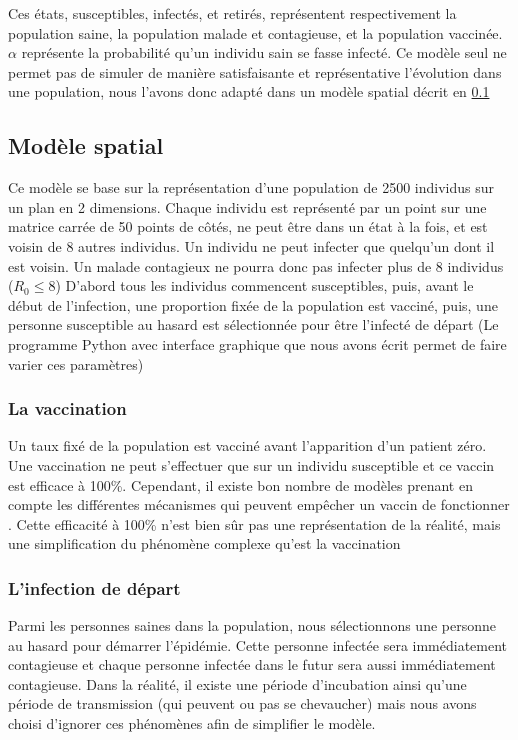\documentclass[journal, a4paper]{IEEEtran}
\begin{document}
	Ces états, susceptibles, infectés, et retirés, représentent respectivement la population saine, la population malade et contagieuse, et la population vaccinée. $\alpha$ représente la probabilité qu'un individu sain se fasse infecté.
	Ce modèle seul ne permet pas de simuler de manière satisfaisante et représentative l'évolution dans une population, nous l'avons donc adapté dans un modèle spatial décrit en \ref{sec:modele_spatial}


	\subsection{Modèle spatial}
	\label{sec:modele_spatial}
	Ce modèle se base sur la représentation d'une population de 2500 individus sur un plan en 2 dimensions. Chaque individu est représenté par un point sur une matrice carrée de 50 points de côtés, ne peut être dans un état à la fois, et est voisin de 8 autres individus. Un individu ne peut infecter que quelqu'un dont il est voisin. Un malade contagieux ne pourra donc pas infecter plus de 8 individus ($R_0 \leq 8$)
	D'abord tous les individus commencent susceptibles, puis, avant le début de l'infection, une proportion fixée de la population est vacciné, puis, une personne susceptible au hasard est sélectionnée pour être l'infecté de départ (Le programme Python avec interface graphique que nous avons écrit permet de faire varier ces paramètres)
	\subsubsection{La vaccination}
	Un taux fixé de la population est vacciné avant l'apparition d'un patient zéro. Une vaccination ne peut s'effectuer que sur un individu susceptible et ce vaccin est efficace à 100\%. Cependant, il existe bon nombre de modèles prenant en compte les différentes mécanismes qui peuvent empêcher un vaccin de fonctionner \cite{Crowcroft_Klein_2018}. Cette efficacité à 100\% n'est bien sûr pas une représentation de la réalité, mais une simplification du phénomène complexe qu'est la vaccination
	\subsubsection{L'infection de départ}
	Parmi les personnes saines dans la population, nous sélectionnons une personne au hasard pour démarrer l'épidémie. Cette personne infectée sera immédiatement contagieuse et chaque personne infectée dans le futur sera aussi immédiatement contagieuse. Dans la réalité, il existe une période d'incubation ainsi qu'une période de transmission (qui peuvent ou pas se chevaucher) mais nous avons choisi d'ignorer ces phénomènes afin de simplifier le modèle.
\end{document}
